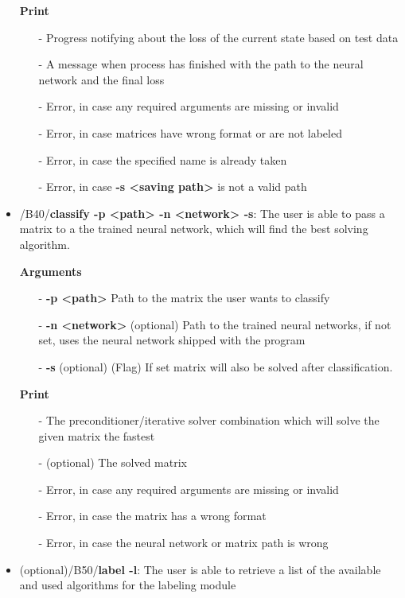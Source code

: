 \documentclass[parskip=full]{scrartcl}
\begin{document}
\begin{itemize}
\textbf{Print}
	\begin{itemize}
	\item[-]Progress notifying about the loss of the current state based on test data
	\item[-]A message when process has finished with the path to the \gls{neural network} and the final loss
	\item[-]Error, in case any required arguments are missing or invalid
	\item[-]Error, in case matrices have wrong format or are not labeled
	\item[-]Error, in case the specified name is already taken
	\item[-]Error, in case \textbf{-s <saving path>} is not a valid path
	\end{itemize}

\item/B40/\textbf{classify -p <path> -n <network> -s}:
\newline The user is able to pass a matrix to a the trained \gls{neural network}, which will find the best solving \gls{algorithm}.

\textbf{Arguments}
	\begin{itemize}
	\item[-]\textbf{-p <path>} Path to the matrix the user wants to classify
	\item[-]\textbf{-n <network>} (optional) Path to the trained \glspl{neural network}, if not set, uses the \gls{neural network} shipped with the program
	\item[-]\textbf{-s} (optional) (Flag) If set matrix will also be solved after classification.
	\end{itemize}

\textbf{Print}
	\begin{itemize}
	\item[-]The \gls{preconditioner}/\gls{iterative solver} combination which will solve the given matrix the fastest
	\item[-](optional) The solved matrix
	\item[-]Error, in case any required arguments are missing or invalid
	\item[-]Error, in case the matrix has a wrong format
	\item[-]Error, in case the \gls{neural network} or matrix path is wrong
	\end{itemize}

\item(optional)/B50/\textbf{label -l}:
\newline The user is able to retrieve a list of the available and used algorithms for the labeling module


\end{itemize}
\end{document}

